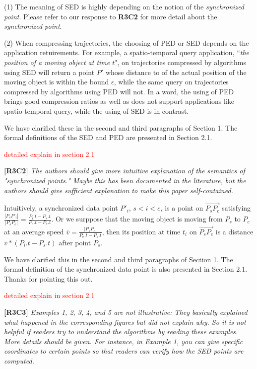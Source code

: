 \documentclass{letter}
\begin{document}
(1) The meaning of SED is highly depending on the notion of the \emph{synchronized point}. Please refer to our response to \textbf{R3C2} for more detail about the \emph{synchronized point}. 

(2) When compressing trajectories, the choosing of PED or SED depends on the application retuirements. For example, a spatio-temporal query application, ``\emph{the position of a moving object at time $t$}", on trajectories compressed by algorithms using SED will return a point $P'$ whose distance to of the actual position of the moving object is within the bound $\epsilon$, while the same query on trajectories compressed by algorithms using PED will not. In a word, the using of PED brings good compression ratios as well as does not support applications like spatio-temporal query, while the using of SED is in contrast.

We have clarified these in the second and third paragraphs of Section 1. 
The formal definitions of the SED and PED are presented in Section 2.1.

\textcolor{red}{detailed explain in section 2.1}

\textbf{[R3C2]} \emph{The authors should give more intuitive explanation of the semantics of "synchronized points." Maybe this has been documented in the literature, but the authors should give sufficient explanation to make this paper self-contained.}

Intuitively, a synchronized data point $P'_i$, $s<i<e$, is a point on $\overrightarrow{P_sP_{e}}$ satisfying $\frac{|P_sP'_i|}{|P_sP_e|} = \frac{P_i.t - P_s.t}{P_e.t-P_s.t}$. 
Or we surppose that the moving object is moving from $P_s$ to $P_e$ at an average speed $\overline{v} = \frac{|P_sP_e|}{P_e.t-P_s.t}$, then its position at time $t_i$ on $\overrightarrow{P_sP_{e}}$ is a distance $\overline{v}*(P_i.t-P_s.t)$ after point $P_s$.

We have clarified this in the second and third paragraphs of Section 1. The formal definition of the synchronized data point is also presented in Section 2.1.
Thanks for pointing this out.


\textcolor{red}{detailed explain in section 2.1}

\textbf{[R3C3]} \emph{Examples 1, 2, 3, 4, and 5 are not illustrative: They basically explained what happened in the corresponding figures but did not explain why. So it is not helpful if readers try to understand the algorithms by reading these examples. More details should be given. For instance, in Example 1, you can give specific coordinates to certain points so that readers can verify how the SED points are computed.}
\end{document}
